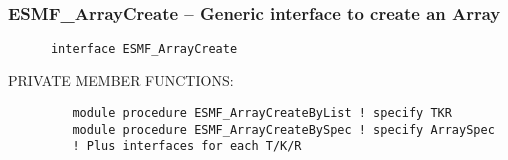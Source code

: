  
\setlength{\parskip}{0pt}
\setlength{\parindent}{0pt}
\setlength{\baselineskip}{11pt}
 
\def\bv{\begin{verbatim}}
\def\ev{\end{verbatim}}
\def\be{\begin{equation}}
\def\ee{\end{equation}}
\def\bea{\begin{eqnarray}}
\def\eea{\end{eqnarray}}
\def\bi{\begin{itemize}}
\def\ei{\end{itemize}}
\def\bn{\begin{enumerate}}
\def\en{\end{enumerate}}
\def\bd{\begin{description}}
\def\ed{\end{description}}
\def\({\left (}
\def\){\right )}
\def\[{\left [}
\def\]{\right ]}
\def\<{\left  \langle}
\def\>{\right \rangle}
\def\cI{{\cal I}}
\def\diag{\mathop{\rm diag}}
\def\tr{\mathop{\rm tr}}

 
 
\mbox{}\hrulefill\ 
 
\subsubsection [ESMF\_ArrayCreate] {ESMF\_ArrayCreate -- Generic interface to create an Array}


\begin{verbatim}      interface ESMF_ArrayCreate\end{verbatim}{\sf PRIVATE MEMBER FUNCTIONS:}
\begin{verbatim}         module procedure ESMF_ArrayCreateByList ! specify TKR
         module procedure ESMF_ArrayCreateBySpec ! specify ArraySpec
         ! Plus interfaces for each T/K/R\end{verbatim}
 
